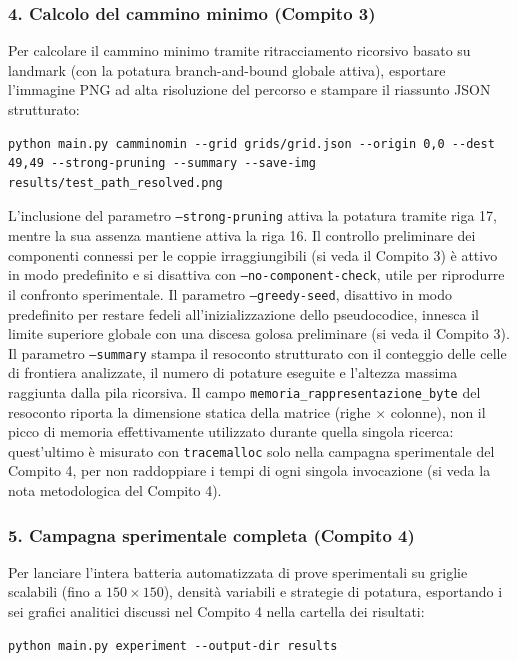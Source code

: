 \subsubsection{4. Calcolo del cammino minimo (Compito 3)}
Per calcolare il cammino minimo tramite ritracciamento ricorsivo basato su landmark (con la potatura branch-and-bound globale attiva), esportare l'immagine PNG ad alta risoluzione del percorso e stampare il riassunto JSON strutturato:
\begin{lstlisting}[style=comandoshell]
python main.py camminomin --grid grids/grid.json --origin 0,0 --dest 49,49 --strong-pruning --summary --save-img results/test_path_resolved.png
\end{lstlisting}
L'inclusione del parametro \texttt{--strong-pruning} attiva la potatura tramite riga 17, mentre la sua assenza mantiene attiva la riga 16. Il controllo preliminare dei componenti connessi per le coppie irraggiungibili (si veda il Compito 3) è attivo in modo predefinito e si disattiva con \texttt{--no-component-check}, utile per riprodurre il confronto sperimentale. Il parametro \texttt{--greedy-seed}, disattivo in modo predefinito per restare fedeli all'inizializzazione dello pseudocodice, innesca il limite superiore globale con una discesa golosa preliminare (si veda il Compito 3). Il parametro \texttt{--summary} stampa il resoconto strutturato con il conteggio delle celle di frontiera analizzate, il numero di potature eseguite e l'altezza massima raggiunta dalla pila ricorsiva. Il campo \texttt{memoria\_rappresentazione\_byte} del resoconto riporta la dimensione statica della matrice (righe $\times$ colonne), non il picco di memoria effettivamente utilizzato durante quella singola ricerca: quest'ultimo è misurato con \texttt{tracemalloc} solo nella campagna sperimentale del Compito 4, per non raddoppiare i tempi di ogni singola invocazione (si veda la nota metodologica del Compito 4).

\subsubsection{5. Campagna sperimentale completa (Compito 4)}
Per lanciare l'intera batteria automatizzata di prove sperimentali su griglie scalabili (fino a $150\times150$), densità variabili e strategie di potatura, esportando i sei grafici analitici discussi nel Compito 4 nella cartella dei risultati:
\begin{lstlisting}[style=comandoshell]
python main.py experiment --output-dir results
\end{lstlisting}

